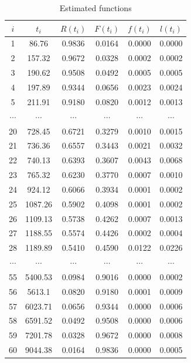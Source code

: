 \documentclass{article}
\begin{document}
    \begin{table}[H]
        \centering
        \caption{Estimated functions}
        \label{tab:my-table}
        \begin{tabular}{|c|c|cccc|}
            \hline
            $i$ & $t_i$ & $R(t_i)$ & $F(t_i)$ & $f(t_i)$ & $l(t_i)$ \\
            \hline
            1  & 86.76  & 0.9836 & 0.0164 & 0.0000 & 0.0000 \\
            2  & 157.32 & 0.9672 & 0.0328 & 0.0002 & 0.0002 \\
            3  & 190.62 & 0.9508 & 0.0492 & 0.0005 & 0.0005 \\
            4  & 197.89 & 0.9344 & 0.0656 & 0.0023 & 0.0024 \\
            5  & 211.91 & 0.9180 & 0.0820 & 0.0012 & 0.0013 \\
            $\cdots$ & $\cdots$ & $\cdots$ & $\cdots$ & $\cdots$ & $\cdots$ \\
            20 & 728.45 & 0.6721 & 0.3279 & 0.0010 & 0.0015 \\
            21 & 736.36 & 0.6557 & 0.3443 & 0.0021 & 0.0032 \\
            22 & 740.13 & 0.6393 & 0.3607 & 0.0043 & 0.0068 \\
            23 & 765.32 & 0.6230 & 0.3770 & 0.0007 & 0.0010 \\
            24 & 924.12 & 0.6066 & 0.3934 & 0.0001 & 0.0002 \\
            25 & 1087.26 & 0.5902 & 0.4098 & 0.0001 & 0.0002 \\
            26 & 1109.13 & 0.5738 & 0.4262 & 0.0007 & 0.0013 \\
            27 & 1188.55 & 0.5574 & 0.4426 & 0.0002 & 0.0004 \\
            28 & 1189.89 & 0.5410 & 0.4590 & 0.0122 & 0.0226 \\
            $\cdots$ & $\cdots$ & $\cdots$ & $\cdots$ & $\cdots$ & $\cdots$ \\
            55 & 5400.53 & 0.0984 & 0.9016 & 0.0000 & 0.0002 \\
            56 & 5613.1 & 0.0820 & 0.9180 & 0.0001 & 0.0009 \\
            57 & 6023.71 & 0.0656 & 0.9344 & 0.0000 & 0.0006 \\
            58 & 6591.52 & 0.0492 & 0.9508 & 0.0000 & 0.0006 \\
            59 & 7201.78 & 0.0328 & 0.9672 & 0.0000 & 0.0008 \\
            60 & 9044.38 & 0.0164 & 0.9836 & 0.0000 & 0.0005 \\
            \hline
        \end{tabular}
    \end{table}
\end{document}
